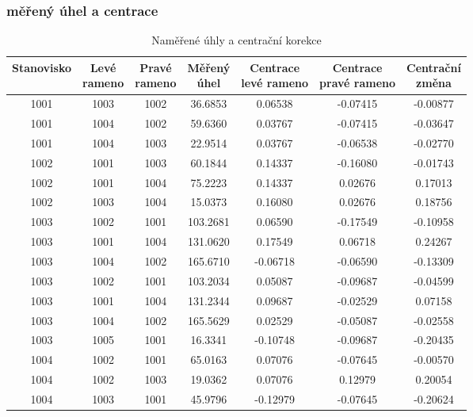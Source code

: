 \subsubsection{měřený úhel a centrace}
\begin{table}[H]
    \centering
    
    \begin{tabular}{|c|c|c||c|c|c|c|}
        \hline
        Stanovisko & \makecell{Levé\\rameno} & \makecell{Pravé\\rameno} & \makecell{Měřený\\úhel} & \makecell{Centrace\\levé rameno} & \makecell{Centrace\\pravé rameno} & \makecell{Centrační\\změna} \\
        \hline
        1001 & 1003 & 1002 & 36.6853 & 0.06538 & -0.07415 & -0.00877 \\
        1001 & 1004 & 1002 & 59.6360 & 0.03767 & -0.07415 & -0.03647 \\
        1001 & 1004 & 1003 & 22.9514 & 0.03767 & -0.06538 & -0.02770 \\
        \hline
        1002 & 1001 & 1003 & 60.1844 & 0.14337 & -0.16080 & -0.01743 \\
        1002 & 1001 & 1004 & 75.2223 & 0.14337 & 0.02676 & 0.17013 \\
        1002 & 1003 & 1004 & 15.0373 & 0.16080 & 0.02676 & 0.18756 \\
        \hline
        1003 & 1002 & 1001 & 103.2681 & 0.06590 & -0.17549 & -0.10958 \\
        1003 & 1001 & 1004 & 131.0620 & 0.17549 & 0.06718 & 0.24267 \\
        1003 & 1004 & 1002 & 165.6710 & -0.06718 & -0.06590 & -0.13309 \\
        1003 & 1002 & 1001 & 103.2034 & 0.05087 & -0.09687 & -0.04599 \\
        1003 & 1001 & 1004 & 131.2344 & 0.09687 & -0.02529 & 0.07158 \\
        1003 & 1004 & 1002 & 165.5629 & 0.02529 & -0.05087 & -0.02558 \\
        1003 & 1005 & 1001 & 16.3341 & -0.10748 & -0.09687 & -0.20435 \\
        \hline
        1004 & 1002 & 1001 & 65.0163 & 0.07076 & -0.07645 & -0.00570 \\
        1004 & 1002 & 1003 & 19.0362 & 0.07076 & 0.12979 & 0.20054 \\
        1004 & 1003 & 1001 & 45.9796 & -0.12979 & -0.07645 & -0.20624 \\
        \hline
    \end{tabular}
    \caption{Naměřené úhly a centrační korekce}
\end{table}

